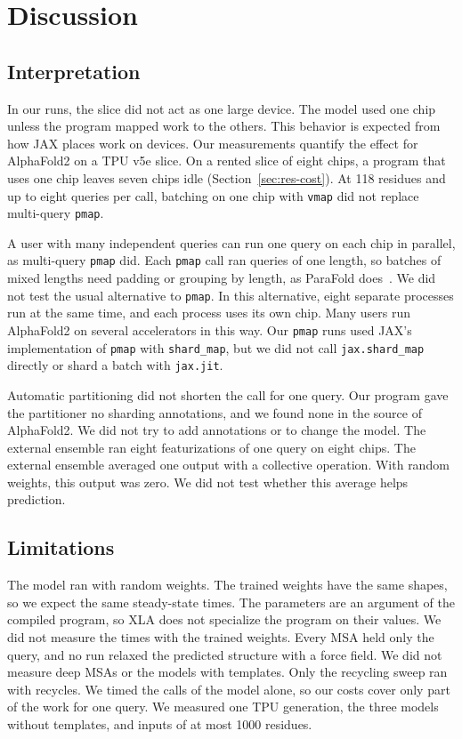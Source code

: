 \section{Discussion}\label{sec:discussion}

\subsection{Interpretation}
In our runs, the slice did not act as one large device. The model used one chip unless the program mapped work to the
others. This behavior is expected from how JAX places work on devices. Our measurements quantify the effect for
AlphaFold2 on a TPU v5e slice. On a rented slice of eight chips, a program that uses one chip leaves seven chips idle
(Section~\ref{sec:res-cost}).
At 118 residues and up to eight queries per call, batching on one chip with \texttt{vmap} did not replace multi-query \texttt{pmap}. %

A user with many independent queries can run one query on each chip in parallel, as multi-query \texttt{pmap} did. Each
\texttt{pmap} call ran queries of one length, so batches of mixed lengths need padding or grouping by length, as
ParaFold does~\cite{zhong2022parafold}.
We did not test the usual alternative to \texttt{pmap}. In this alternative, eight separate processes run at the same time, and each process uses its own chip.
Many users run AlphaFold2 on several accelerators in this way. Our \texttt{pmap} runs used JAX's implementation of
\texttt{pmap} with \texttt{shard\_map}, but we did not call \texttt{jax.shard\_map} directly or shard a batch with
\texttt{jax.jit}.

Automatic partitioning did not shorten the call for one query. Our program gave the partitioner no sharding
annotations, and we found none in the source of AlphaFold2. We did not try to add annotations or to change the model.
The external ensemble ran eight featurizations of one query on eight chips. The external ensemble averaged one output
with a collective operation. With random weights, this output was zero. We did not test whether this average helps
prediction.

\subsection{Limitations}\label{sec:limitations}
The model ran with random weights. The trained weights have the same shapes, so we expect the same steady-state times.
The parameters are an argument of the compiled program, so XLA does not specialize the program on their values. We did
not measure the times with the trained weights. Every MSA held only the query, and no run relaxed the predicted
structure with a force field. We did not measure deep MSAs or the models with templates. Only the recycling sweep ran with recycles. We
timed the calls of the model alone, so our costs cover only part of the work for one query.
We measured one TPU generation, the three models without templates, and inputs of at most 1000 residues. %

